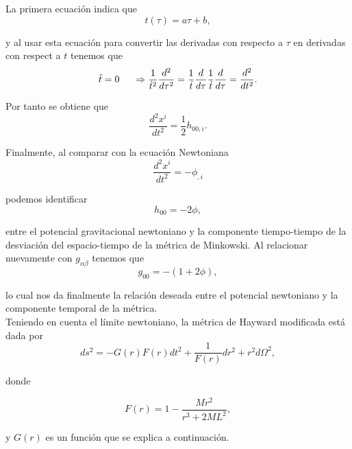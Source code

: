 \documentclass[16pt,a4paper]{article}
\numberwithin{equation}{section}
\theoremstyle{definition}
\begin{document}
La primera ecuación indica que 
\begin{equation*}
t(\tau) = a\tau + b,
\end{equation*}

y al usar esta ecuación para convertir las derivadas con respecto a $\tau$ en derivadas con respect a $t$ tenemos que 	
\begin{equation*}
\ddot{t} = 0 \hspace{.5cm} \Rightarrow \frac{1}{\dot{t}^2}\frac{d^2}{d\tau^2} = \frac{1}{\dot{t}}\frac{d}{d\tau}\frac{1}{\dot{t}}\frac{d}{d\tau} = \frac{d^2}{dt^2}.
\end{equation*}

Por tanto se obtiene que 
\begin{equation*}
\frac{d^2x^i}{dt^2} = \frac{1}{2}h_{00,i}.
\end{equation*}

Finalmente, al comparar con la ecuación Newtoniana 
\begin{equation*}
\frac{d^2x^i}{dt^2} = -\phi_{,i}
\end{equation*}

podemos identificar 
\begin{equation*}
h_{00} = -2\phi,
\end{equation*}

entre el potencial gravitacional newtoniano y la componente tiempo-tiempo de la desviación del espacio-tiempo de la métrica de Minkowski. Al relacionar nuevamente con $g_{\alpha \beta}$ tenemos que 
\begin{equation}
\label{newton - metric}
g_{00} = - (1 + 2\phi),
\end{equation}

lo cual nos da finalmente la relación deseada entre el potencial newtoniano y la componente temporal de la métrica.\\

Teniendo en cuenta el límite newtoniano, la métrica de Hayward modificada está dada por 
\begin{equation}
\label{reg-schF}
ds^2 = -G(r)F(r) dt^2 + \frac{1}{F(r)} dr^2 + r^2d\Omega^2,
\end{equation}

donde

\begin{equation}
\label{mod-hay-f}
F(r) = 1 - \frac{Mr^2}{r^3 + 2ML^2},
\end{equation}

y $G(r)$ es un función que se explica a continuación.\\
\end{document}
